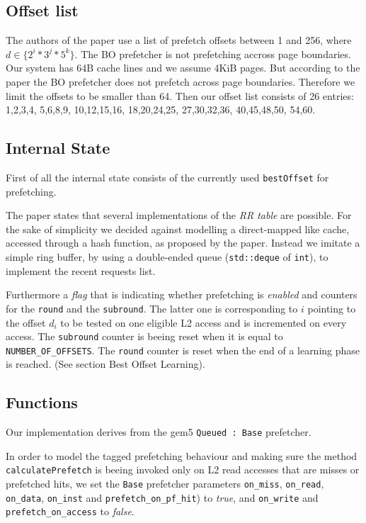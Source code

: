\documentclass[conference]{IEEEtran}
\begin{document}
\subsection{Offset list}

The authors of the paper \cite{BOP_2016} use a list of prefetch offsets between 1 and 256, where $d \in \{2^i*3^j*5^k\}$.
The BO prefetcher is not prefetching accross page boundaries. Our system has 64B cache lines and we assume 4KiB pages.
But according to the paper the BO prefetcher does not prefetch across page boundaries.
Therefore we limit the offsets to be smaller than 64.
Then our offset list consists of 26 entries:
1,2,3,4,
5,6,8,9,
10,12,15,16,
18,20,24,25,
27,30,32,36,
40,45,48,50,
54,60.

\subsection{Internal State}
First of all the internal state consists of the currently used \texttt{bestOffset} for prefetching.

The paper states that several implementations of the \textit{RR table} are possible.
For the sake of simplicity we decided against modelling a direct-mapped like cache, accessed through a hash function, as proposed by the paper.
Instead we imitate a simple ring buffer, by using a double-ended queue (\texttt{std::deque} of \texttt{int}), to implement the recent requests list.


Furthermore a \textit{flag} that is indicating whether prefetching is \textit{enabled} and
counters for the \texttt{round} and
the \texttt{subround}. The latter one is corresponding to $i$ pointing to the offset $d_i$ to be tested on one eligible L2 access and is incremented on every access.
The \texttt{subround} counter is beeing reset when it is equal to \texttt{NUMBER\_OF\_OFFSETS}.
The \texttt{round} counter is reset when the end of a learning phase is reached. (See section Best Offset Learning).


\subsection{Functions}

Our implementation derives from the gem5 \texttt{Queued : Base} prefetcher.

In order to model the tagged prefetching behaviour and making sure the method \texttt{calculatePrefetch} is beeing invoked only on L2 read accesses that are misses or prefetched hits,
we set the \texttt{Base} prefetcher parameters
\texttt{on\_miss}, \texttt{on\_read}, \texttt{on\_data}, \texttt{on\_inst} and \texttt{prefetch\_on\_pf\_hit}) to \textit{true},
and \texttt{on\_write} and \texttt{prefetch\_on\_access} to \textit{false}.
\end{document}

